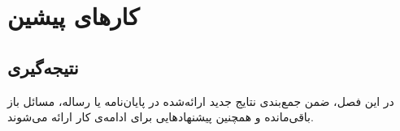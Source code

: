 \chapter{کارهای پیشین}
\section{نتیجه‌گیری}

در این فصل، ضمن جمع‌بندی نتایج جدید ارائه‌شده در پایان‌نامه یا رساله،
مسائل باز باقی‌مانده و همچنین پیشنهادهایی برای ادامه‌ی کار ارائه می‌شوند.
